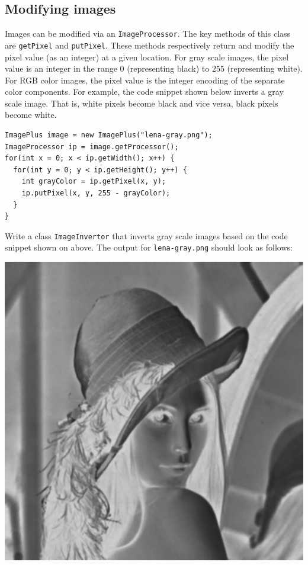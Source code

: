 \documentclass{book}
\begin{document}
\subsection{Modifying images}
Images can be modified via an \texttt{ImageProcessor}. The key methods of this class are \texttt{getPixel} and \texttt{putPixel}. These methods respectively return and modify the pixel value (as an integer) at a given location. For gray scale images, the pixel value is an integer in the range 0 (representing black) to 255 (representing white). For RGB color images, the pixel value is the integer encoding of the separate color components.  For example, the code snippet shown below inverts a gray scale image. That is, white pixels become black and vice versa, black pixels become white.

\begin{lstlisting}
ImagePlus image = new ImagePlus("lena-gray.png");
ImageProcessor ip = image.getProcessor();
for(int x = 0; x < ip.getWidth(); x++) {
  for(int y = 0; y < ip.getHeight(); y++) {
    int grayColor = ip.getPixel(x, y);
    ip.putPixel(x, y, 255 - grayColor);
  }  
}
\end{lstlisting}

\begin{exercise}\label{ex:invert}
Write a class \texttt{ImageInvertor} that inverts gray scale images based on the code snippet shown on above. The output for \texttt{lena-gray.png} should look as follows:
\begin{center}
\includegraphics[scale=0.2]{lena-gray-inverted.png}
\end{center}
\end{exercise}
\end{document}
